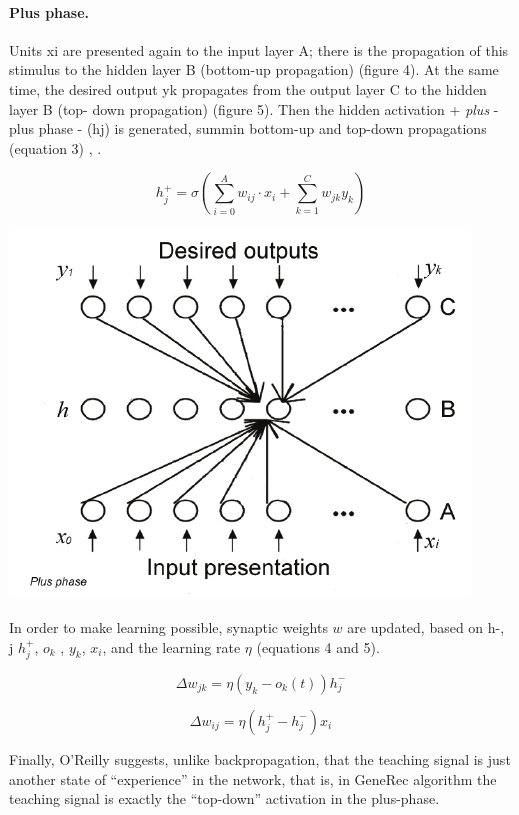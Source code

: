 \paragraph{Plus phase.} Units xi are presented again to the input layer A; there is the propagation of this stimulus to the hidden layer B (bottom-up propagation) (figure 4). At the same time, the desired output yk propagates from the output layer C to the hidden layer B (top- down propagation) (figure 5). Then the hidden activation + \emph{plus} - plus phase - (hj) is generated, summin bottom-up and top-down propagations (equation 3) \citet{o1996bio}, \citet{orru2008sabio}.

$$h_j^+ = \sigma\left( \sum_{i=0}^A w_{ij} \cdot x_i + \sum_{k=1}^C w_{jk} y_k \right)$$

\begin{center} 
\includegraphics{img/generec_plus_phase.png} \citet{orru2008sabio} 
\end{center} 

In order to make learning possible, synaptic weights $w$ are updated, based on h-, j  $h^+_j$, $o_k$ , $y_k$, $x_i$, and the learning rate $\eta$ (equations 4 and 5).

$$\Delta w_{jk} = \eta(y_k - o_k(t)) h^-_j $$

$$\Delta w_{ij} = \eta(h^+_j - h^-_j) x_i$$

Finally, O’Reilly \citet{o1998six} suggests, unlike backpropagation, that the teaching signal is just another state of “experience” in the network, that is, in GeneRec algorithm the teaching signal is exactly the “top-down” activation in the plus-phase.


